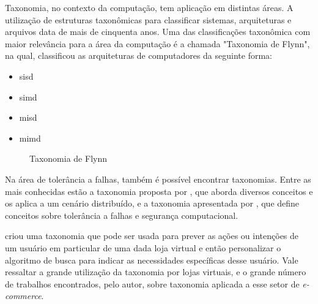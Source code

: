 \par
Taxonomia, no contexto da computação, tem aplicação em distintas áreas. A utilização de estruturas taxonômicas para classificar sistemas, arquiteturas e arquivos data de mais de
cinquenta anos. Uma das classificações taxonômica com maior relevância para a área da computação é a chamada "Taxonomia de Flynn",
na qual,  classificou as arquiteturas de computadores da seguinte forma:\\

\begin{minipage}{.66\textwidth}
    \begin{singlespace}
        \begin{itemize}
            \item \acrfull{sisd}
            \item \acrfull{simd}
            \item \acrfull{misd}
            \item \acrfull{mimd}
        \end{itemize}
    \end{singlespace}
\end{minipage}
\vspace{0.5cm}

\begin{figure}[!ht]
    \caption{Taxonomia de Flynn}
    \label{fig:taxonomiaFlynn}  
\end{figure}

\vspace{0.5cm}
\par
Na área de tolerância a falhas, também é possível encontrar taxonomias. Entre as mais conhecidas estão a taxonomia proposta por
, que aborda diversos conceitos e os aplica a um cenário distribuído,
e a taxonomia apresentada por , que define conceitos sobre tolerância a falhas e segurança computacional.

\par
{} criou uma taxonomia que pode ser usada para prever as ações ou intenções de um usuário em particular de uma dada loja virtual
e então personalizar o algoritmo de busca para indicar as necessidades específicas desse usuário. Vale ressaltar a grande utilização da taxonomia por lojas virtuais, 
e o grande número de trabalhos encontrados, pelo autor, sobre taxonomia aplicada a esse setor de \textit{e-commerce}.

